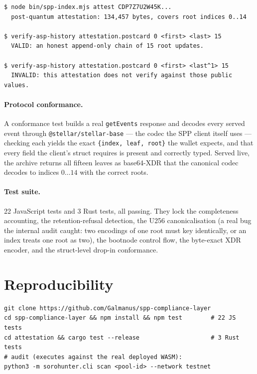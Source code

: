 \documentclass[11pt]{article}
\newcommand{\code}[1]{\texttt{\small #1}}
\begin{document}
\begin{lstlisting}
$ node bin/spp-index.mjs attest CDP7Z7U2W45K...
  post-quantum attestation: 134,457 bytes, covers root indices 0..14

$ verify-asp-history attestation.postcard 0 <first> <last> 15
  VALID: an honest append-only chain of 15 root updates.

$ verify-asp-history attestation.postcard 0 <first> <last^1> 15
  INVALID: this attestation does not verify against those public values.
\end{lstlisting}

\paragraph{Protocol conformance.} A conformance test builds a real
\code{getEvents} response and decodes every served event through
\code{@stellar/stellar-base} --- the codec the SPP client itself uses --- checking
each yields the exact \code{\{index, leaf, root\}} the wallet expects, and that
every field the client's struct requires is present and correctly typed. Served
live, the archive returns all fifteen leaves as base64-XDR that the canonical
codec decodes to indices $0\dots14$ with the correct roots.

\paragraph{Test suite.} 22 JavaScript tests and 3 Rust tests, all passing. They
lock the completeness accounting, the retention-refusal detection, the U256
canonicalisation (a real bug the internal audit caught: two encodings of one root
must key identically, or an index treats one root as two), the bootnode control
flow, the byte-exact XDR encoder, and the struct-level drop-in conformance.

\section{Reproducibility}

\begin{lstlisting}
git clone https://github.com/Galmanus/spp-compliance-layer
cd spp-compliance-layer && npm install && npm test        # 22 JS tests
cd attestation && cargo test --release                    # 3 Rust tests
# audit (executes against the real deployed WASM):
python3 -m sorohunter.cli scan <pool-id> --network testnet
\end{lstlisting}
\end{document}
